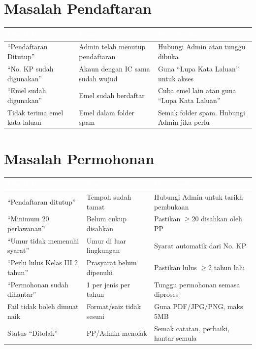 \documentclass[12pt,a4paper]{report}
\begin{document}
\section{Masalah Pendaftaran}

\begin{longtable}{L{4cm} L{3.5cm} L{6.5cm}}
\toprule
{}
\textcolor{white}{\textbf{Masalah}} & \textcolor{white}{\textbf{Punca}} & \textcolor{white}{\textbf{Penyelesaian}} \\
\midrule
\endhead
{}
``Pendaftaran Ditutup'' & Admin telah menutup pendaftaran & Hubungi Admin atau tunggu dibuka \\
``No. KP sudah digunakan'' & Akaun dengan IC sama sudah wujud & Guna ``Lupa Kata Laluan'' untuk akses \\
``Emel sudah digunakan'' & Emel sudah berdaftar & Cuba emel lain atau guna ``Lupa Kata Laluan'' \\
Tidak terima emel kata laluan & Emel dalam folder spam & Semak folder spam. Hubungi Admin jika perlu \\
\bottomrule
\end{longtable}

\section{Masalah Permohonan}

\begin{longtable}{L{4cm} L{3.5cm} L{6.5cm}}
\toprule
{}
\textcolor{white}{\textbf{Masalah}} & \textcolor{white}{\textbf{Punca}} & \textcolor{white}{\textbf{Penyelesaian}} \\
\midrule
\endhead
{}
``Pendaftaran ditutup'' & Tempoh sudah tamat & Hubungi Admin untuk tarikh pembukaan \\
``Minimum 20 perlawanan'' & Belum cukup disahkan & Pastikan $\geq$20 disahkan oleh PP \\
``Umur tidak memenuhi syarat'' & Umur di luar lingkungan & Syarat automatik dari No. KP \\
``Perlu lulus Kelas III 2 tahun'' & Prasyarat belum dipenuhi & Pastikan lulus $\geq$2 tahun lalu \\
``Permohonan sudah dihantar'' & 1 per jenis per tahun & Tunggu permohonan semasa diproses \\
Fail tidak boleh dimuat naik & Format/saiz tidak sesuai & Guna PDF/JPG/PNG, maks 5MB \\
Status ``Ditolak'' & PP/Admin menolak & Semak catatan, perbaiki, hantar semula \\
\bottomrule
\end{longtable}
\end{document}
